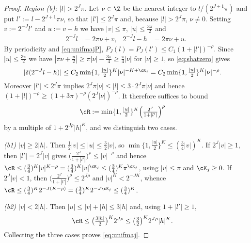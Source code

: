 \documentclass[a4paper, 11pt]{article}
\DeclareMathOperator{\1}{\mathds{1}}
\begin{document}
\begin{proof}
\emph{Region (b): $|l|>2^{J}\pi$.} Let $\nu\in\Z$ be the nearest integer to $l/(2^{J+1}\pi)$ and put $l':=l-2^{J+1}\pi\nu$, so that $|l'|\leq2^{J}\pi$ and, because $|l|>2^{J}\pi$, $\nu\neq0$. Setting $v:=2^{-J}l'$ and $u:=v-h$ we have $|v|\leq\pi$, $|u|\leq\tfrac{3\pi}{2}$ and
\begin{align*}
2^{-J}l & = 2\pi\nu+v, & 2^{-J}l-h & = 2\pi\nu+u.
\end{align*}
By periodicity and \eqref{eq:unifmajP}, $P_{J}(l)=P_{J}(l')\leq C_{1}(1+|l'|)^{-\rho}$. Since $|u|\leq\tfrac{3\pi}{2}$ we have $|\pi\nu+\tfrac{u}{2}|\geq\pi|\nu|-\tfrac{3\pi}{4}\geq\tfrac{\pi}{4}|\nu|$ for $|\nu|\geq1$, so \eqref{eq:shatzero} gives
\begin{align*}
|\hat{s}(2^{-J}l-h)| & \leq C_{2}\min\{1,\tfrac{|u|}{2}\}^{K}|\nu|^{-K+\cK_{j}} = C_{2}\min\{1,\tfrac{|u|}{2}\}^{K}|\nu|^{-\rho}.
\end{align*}
Moreover $|l'|\leq2^{J}\pi$ implies $2^{J}\pi|\nu|\leq|l|\leq3\cdot2^{J}\pi|\nu|$ and hence $(1+|l|)^{-\rho}\geq(1+3\pi)^{-\rho}(2^{J}|\nu|)^{-\rho}$. It therefore suffices to bound
\begin{align*}
\cR & := \min\{1,\tfrac{|u|}{2}\}^{K}\Big(\tfrac{2^{J}}{1+|l'|}\Big)^{\rho}
\end{align*}
by a multiple of $1+2^{J\rho}|h|^{K}$, and we distinguish two cases.

\emph{(b1) $|v|\geq2|h|$.} Then $\tfrac{1}{2}|v|\leq|u|\leq\tfrac{3}{2}|v|$, so $\min\{1,\tfrac{|u|}{2}\}^{K}\leq(\tfrac{3}{4}|v|)^{K}$. If $2^{J}|v|\geq1$, then $|l'|=2^{J}|v|$ gives $\big(\tfrac{2^{J}}{1+|l'|}\big)^{\rho}\leq|v|^{-\rho}$ and hence $\cR\leq(\tfrac{3}{4})^{K}|v|^{K-\rho}=(\tfrac{3}{4})^{K}|v|^{\cK_{j}}\leq(\tfrac{3}{4})^{K}\pi^{\cK_{j}}$, using $|v|\leq\pi$ and $\cK_{j}\geq0$. If $2^{J}|v|<1$, then $\big(\tfrac{2^{J}}{1+|l'|}\big)^{\rho}\leq2^{J\rho}$ and $|v|^{K}<2^{-JK}$, whence $\cR\leq(\tfrac{3}{4})^{K}2^{-J(K-\rho)}=(\tfrac{3}{4})^{K}2^{-J\cK_{j}}\leq(\tfrac{3}{4})^{K}$.

\emph{(b2) $|v|<2|h|$.} Then $|u|\leq|v|+|h|\leq3|h|$ and, using $1+|l'|\geq1$,
\begin{align*}
\cR & \leq \big(\tfrac{3|h|}{2}\big)^{K}2^{J\rho} \leq \big(\tfrac{3}{2}\big)^{K}2^{J\rho}|h|^{K}.
\end{align*}
Collecting the three cases proves \eqref{eq:unifmaj}.
\end{proof}
\end{document}
